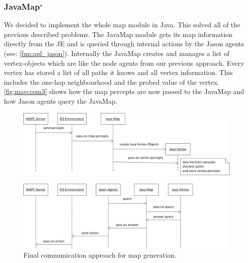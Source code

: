 \subsubsection[JavaMap]{JavaMap$^\star$}\label{alg:map_javamap}
We decided to implement the whole map module in Java.
This solved all of the previous described problems.
The JavaMap module gets its map information directly from the JE and is queried through internal actions by the Jason agents (see: \autoref{fun:apl_jason}).
Internally the JavaMap creates and manages a list of vertex-objects which are like the node agents from our previous approach.
Every vertex has stored a list of all paths it knows and all vertex information.
This includes the one-hop neighbourhood and the probed value of the vertex.
\autoref{fig:map:com3} shows how the map percepts are now passed to the JavaMap and how Jason agents query the JavaMap.
\begin{figure}
  \centering
  \includegraphics[width=\linewidth]{images/map_com_3.png}
  \caption{Final communication approach for map generation.}
  \label{fig:map:com3}
\end{figure}

